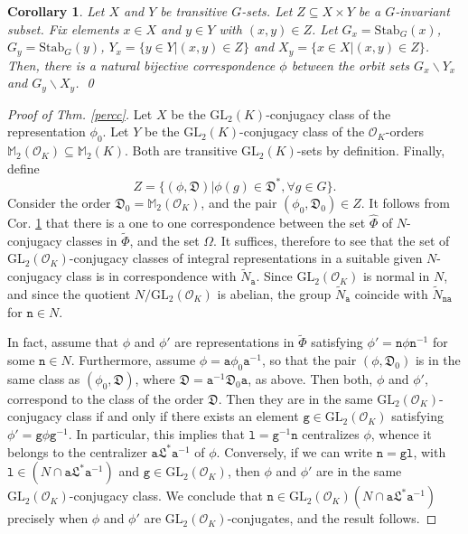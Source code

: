 \documentclass{article}
\newtheorem{Cor}{Corollary}[Prop]
\theoremstyle{definition}
\theoremstyle{remark}
\begin{document}
\begin{Cor}\label{maincor}
    Let $X$ and $Y$ be transitive $G$-sets.
    Let $Z\subseteq X\times Y$
    be a $G$-invariant subset. Fix elements $x\in X$ and $y\in Y$ 
    with $(x,y)\in Z$. Let $G_x=\mathrm{Stab}_G(x)$, 
    $G_y=\mathrm{Stab}_G(y)$, $Y_x=\{y\in Y|(x,y)\in Z\}$ and
    $X_y=\{x\in X|(x,y)\in Z\}$. 
    Then, there is a natural bijective correspondence $\phi$
    between the orbit sets $G_x\backslash Y_x$ and 
    $G_y\backslash X_y$. \qed
\end{Cor}


\begin{proof}[Proof of Thm. \ref{percc}]
 Let $X$ be the 
 $\mathrm{GL}_2(K)$-conjugacy class of the
 representation $\phi_0$. Let $Y$ be the 
 $\mathrm{GL}_2(K)$-conjugacy class of the 
$\mathcal{O}_K$-orders 
$\mathbb{M}_2(\mathcal{O}_K)\subseteq
\mathbb{M}_2(K)$. Both are transitive
$\mathrm{GL}_2(K)$-sets by definition. Finally, 
define $$Z=\{(\phi,\mathfrak{D})|\phi(g)\in\mathfrak{D}^*,
\forall g\in G\}.$$
Consider the order $\mathfrak{D}_0=
\mathbb{M}_2(\mathcal{O}_K)$, 
and the pair $(\phi_0,\mathfrak{D}_0)\in Z$.
It follows from Cor. \ref{maincor} that 
there is a one to one correspondence 
between the set $\hat{\Phi}$ of 
$N$-conjugacy classes in $\tilde{\Phi}$, 
and the set $\Omega$. It suffices, 
therefore to see that the  set of
$\mathrm{GL}_2(\mathcal{O}_K)$-conjugacy  
classes of integral representations in a 
suitable given $N$-conjugacy class is in 
correspondence with $\tilde{N}_\mathtt{a}$. 
Since $\mathrm{GL}_2(\mathcal{O}_K)$ is 
normal in $N$, and since the quotient 
$N/\mathrm{GL}_2(\mathcal{O}_K)$
is abelian, the group 
$\tilde{N}_\mathtt{a}$ coincide with
$\tilde{N}_{\mathtt{n}\mathtt{a}}$ for 
$\mathtt{n}\in N$. 
    
 In fact, assume that $\phi$ and $\phi'$ 
 are representations in $\tilde{\Phi}$ 
 satisfying
 $\phi'=\mathtt{n}\phi \mathtt{n}^{-1}$ for 
 some $\mathtt{n}\in N$. Furthermore,
 assume $\phi=
 \mathtt{a}\phi_0\mathtt{a}^{-1}$, so that
the pair $(\phi,\mathfrak{D}_0)$ is in the 
same class as $(\phi_0,\mathfrak{D})$, 
where 
$\mathfrak{D}=\mathtt{a}^{-1}
\mathfrak{D}_0 \mathtt{a}$,
as above. Then both, $\phi$ and $\phi'$,
correspond to the class of the
order $\mathfrak{D}$. Then they are in the 
same $\mathrm{GL}_2
(\mathcal{O}_K)$-conjugacy class if 
and only if there exists
an element $\mathtt{g}\in
\mathrm{GL}_2(\mathcal{O}_K)$ satisfying 
$\phi'=\mathtt{g}\phi \mathtt{g}^{-1}$. In 
particular, this implies that $\mathtt{l}=
\mathtt{g}^{-1}\mathtt{n}$ centralizes 
$\phi$, whence it belongs to the 
centralizer 
$\mathtt{a}\mathfrak{L}^*\mathtt{a}^{-1}$ 
of $\phi$.  Conversely, if we can write 
$\mathtt{n}=\mathtt{g}\mathtt{l}$, with
$\mathtt{l}\in(N\cap 
\mathtt{a}\mathfrak{L}^*\mathtt{a}^{-1})$
and $\mathtt{g}\in
\mathrm{GL}_2(\mathcal{O}_K)$, then
$\phi$ and $\phi'$ are in the same 
$\mathrm{GL}_2(\mathcal{O}_K)$-conjugacy 
class. We conclude that 
$\mathtt{n}\in\mathrm{GL}_2(\mathcal{O}_K)
(N\cap\mathtt{a}\mathfrak{L}^*
\mathtt{a}^{-1})$ precisely when $\phi$ 
and $\phi'$ are  
$\mathrm{GL}_2(\mathcal{O}_K)$-conjugates, 
and the result follows.
\end{proof}
\end{document}
